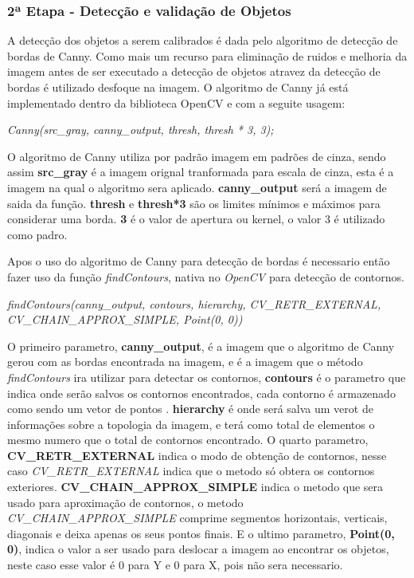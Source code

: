 \subsubsection{2ª Etapa - Detecção e validação de Objetos}
A detecção dos objetos a serem calibrados é dada pelo algoritmo de detecção de bordas de Canny. Como mais um recurso para eliminação de ruidos e melhoria da imagem antes de ser executado a detecção de objetos atravez da detecção de bordas é utilizado desfoque na imagem. O algoritmo de Canny já está implementado dentro da biblioteca OpenCV e com a seguite usagem:
\begin{center}
\centering \textit{  Canny(src\_gray, canny\_output, thresh, thresh * 3, 3);}
\end{center}
O algoritmo de Canny utiliza por padrão imagem em padrões de cinza, sendo assim \textbf{src\_gray} é a imagem orignal tranformada para escala de cinza, esta é a imagem na qual o algoritmo sera aplicado. \textbf{canny\_output} será a imagem de saida da função.
\textbf{thresh} e \textbf{thresh*3} são os limites mínimos e máximos para considerar uma borda. \textbf{3} é o valor de apertura ou kernel, o valor 3 é utilizado como padro.

Apos o uso do algoritmo de Canny para detecção de bordas é necessario então fazer uso da função \textit{findContours}, nativa no \textit{OpenCV} para detecção de contornos.
\begin{center}
\centering \textit{ findContours(canny\_output, contours, hierarchy, CV\_RETR\_EXTERNAL, CV\_CHAIN\_APPROX\_SIMPLE, Point(0, 0))}
\end{center}

O primeiro parametro, \textbf{canny\_output}, é a imagem que o algoritmo de Canny gerou com as bordas encontrada na imagem, e é a imagem que o método \textit{findContours} ira utilizar para detectar os contornos, \textbf{contours} é o parametro que indica onde serão salvos os contornos encontrados, cada contorno é armazenado como sendo um vetor de pontos \cite{OpenCV}. \textbf{hierarchy} é onde será salva um verot de informações sobre a topologia da imagem, e terá como total de elementos o mesmo numero que o total de contornos encontrado\cite{OpenCV}. O quarto parametro, \textbf{CV\_RETR\_EXTERNAL} indica o modo de obtenção de contornos, nesse caso \textit{CV\_RETR\_EXTERNAL} indica que o metodo só obtera os contornos exteriores\cite{OpenCV}. \textbf{CV\_CHAIN\_APPROX\_SIMPLE} indica o metodo que sera usado para aproximação de contornos, o metodo \textit{CV\_CHAIN\_APPROX\_SIMPLE} comprime segmentos horizontais, verticais, diagonais e deixa apenas os seus pontos finais\cite{OpenCV}. E o ultimo parametro, \textbf{Point(0, 0)}, indica o valor a ser usado para deslocar a imagem ao encontrar os objetos, neste caso esse valor é 0 para Y e 0 para X, pois não sera necessario. 

